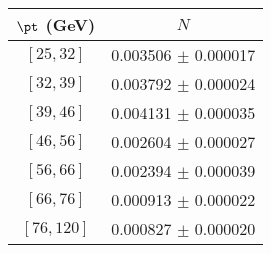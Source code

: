 \begin{tabular}{c||c}
$\pt$ (GeV) & $N$  \\
\hline
$[25, 32]$ & 0.003506 $\pm$ 0.000017\\
$[32, 39]$ & 0.003792 $\pm$ 0.000024\\
$[39, 46]$ & 0.004131 $\pm$ 0.000035\\
$[46, 56]$ & 0.002604 $\pm$ 0.000027\\
$[56, 66]$ & 0.002394 $\pm$ 0.000039\\
$[66, 76]$ & 0.000913 $\pm$ 0.000022\\
$[76, 120]$ & 0.000827 $\pm$ 0.000020\\
\end{tabular}
